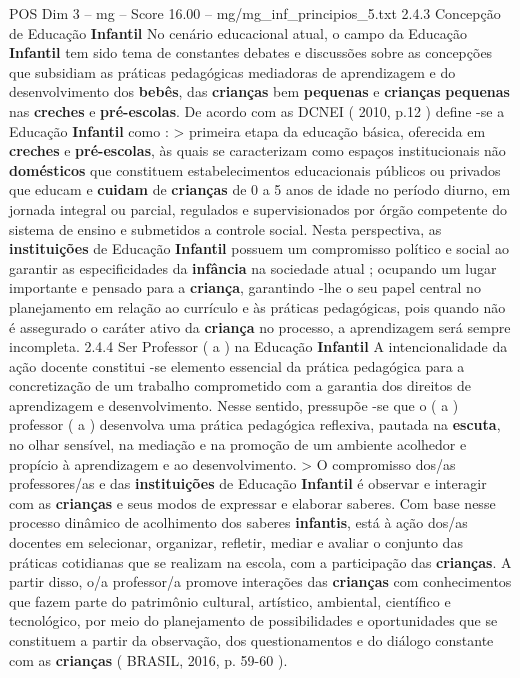 \begin{textsample}{POS Dim 3 – mg – Score 16.00 – mg/mg\_inf\_principios\_5.txt}  \label{ex:f3_pos_264}
2.4.3 Concepção de Educação \textbf{Infantil} No cenário educacional atual, o campo da Educação \textbf{Infantil} tem sido tema de constantes debates e discussões sobre as concepções que subsidiam as práticas pedagógicas mediadoras de aprendizagem e do desenvolvimento dos \textbf{bebês}, das \textbf{crianças} bem \textbf{pequenas} e \textbf{crianças} \textbf{pequenas} nas \textbf{creches} e \textbf{pré-escolas}.
De acordo com as DCNEI ( 2010, p.12 ) define -se a Educação \textbf{Infantil} como : > primeira etapa da educação básica, oferecida em \textbf{creches} e \textbf{pré-escolas}, às quais se caracterizam como espaços institucionais não \textbf{domésticos} que constituem estabelecimentos educacionais públicos ou privados que educam e \textbf{cuidam} de \textbf{crianças} de 0 a 5 anos de idade no período diurno, em jornada integral ou parcial, regulados e supervisionados por órgão competente do sistema de ensino e submetidos a controle social.
Nesta perspectiva, as \textbf{instituições} de Educação \textbf{Infantil} possuem um compromisso político e social ao garantir as especificidades da \textbf{infância} na sociedade atual ; ocupando um lugar importante e pensado para a \textbf{criança}, garantindo -lhe o seu papel central no planejamento em relação ao currículo e às práticas pedagógicas, pois quando não é assegurado o caráter ativo da \textbf{criança} no processo, a aprendizagem será sempre incompleta. 2.4.4 Ser Professor ( a ) na Educação \textbf{Infantil} A intencionalidade da ação docente constitui -se elemento essencial da prática pedagógica para a concretização de um trabalho comprometido com a garantia dos direitos de aprendizagem e desenvolvimento.
Nesse sentido, pressupõe -se que o ( a ) professor ( a ) desenvolva uma prática pedagógica reflexiva, pautada na \textbf{escuta}, no olhar sensível, na mediação e na promoção de um ambiente acolhedor e propício à aprendizagem e ao desenvolvimento. > O compromisso dos/as professores/as e das \textbf{instituições} de Educação \textbf{Infantil} é observar e interagir com as \textbf{crianças} e seus modos de expressar e elaborar saberes.
Com base nesse processo dinâmico de acolhimento dos saberes \textbf{infantis}, está à ação dos/as docentes em selecionar, organizar, refletir, mediar e avaliar o conjunto das práticas cotidianas que se realizam na escola, com a participação das \textbf{crianças}.
A partir disso, o/a professor/a promove interações das \textbf{crianças} com conhecimentos que fazem parte do patrimônio cultural, artístico, ambiental, científico e tecnológico, por meio do planejamento de possibilidades e oportunidades que se constituem a partir da observação, dos questionamentos e do diálogo constante com as \textbf{crianças} ( BRASIL, 2016, p. 59-60 ).

\end{textsample}

